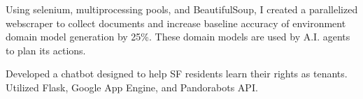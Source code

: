 \documentclass[]{deedy-resume-openfont}
\begin{document}
\begin{minipage}[t]{0.66\textwidth}
\begin{tightemize}
\item Using selenium, multiprocessing pools, and BeautifulSoup, I created a parallelized webscraper to collect documents and increase baseline accuracy of environment domain model generation by 25\%. These domain models are used by A.I. agents to plan its actions.
\end{tightemize}
\sectionsep

\begin{tightemize}
\item Developed a chatbot designed to help SF residents learn their rights as tenants. Utilized Flask, Google App Engine, and Pandorabots API.
\end{tightemize}
\sectionsep

\end{minipage}
\end{document}

